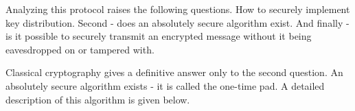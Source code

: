 Analyzing this protocol raises the following questions. How
to securely implement key distribution. Second - does
an absolutely secure algorithm exist. And finally - is
it possible to securely transmit an encrypted message without it being
eavesdropped on or tampered with. 

Classical cryptography gives a definitive answer only to the second
question. An absolutely secure algorithm exists - it is called
the one-time pad. A detailed description of this algorithm is given below.
